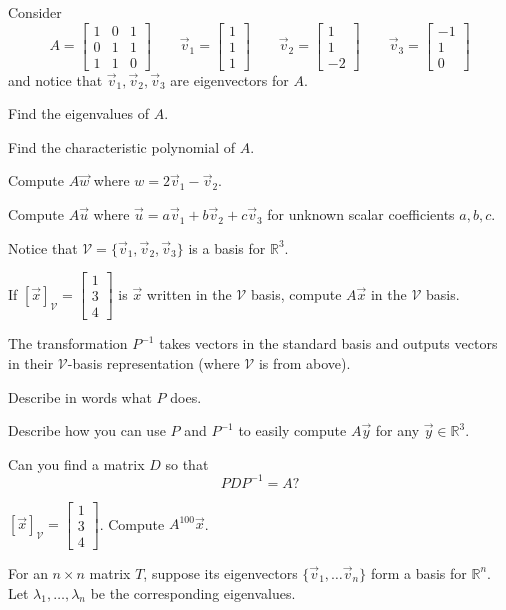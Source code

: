 \documentclass{problemset}
\newcommand{\R}{\mathbb{R}}
\newcommand{\mat}[1]{\begin{bmatrix}#1\end{bmatrix}}
\begin{document}
	\question
	Consider
	\[
		A=\mat{1&0&1\\0&1&1\\1&1&0}\qquad
		\vec v_1=\mat{1\\1\\1}\qquad
		\vec v_2=\mat{1\\1\\-2}\qquad
		\vec v_3=\mat{-1\\1\\0}
	\]
	and notice that $\vec v_1,\vec v_2,\vec v_3$ are eigenvectors for $A$.
	\begin{parts}
		\item Find the eigenvalues of $A$.
		\item Find the characteristic polynomial of $A$.
		\item Compute $A\vec w$ where $w=2\vec v_1-\vec v_2$.
		\item Compute $A\vec u$ where $\vec u=a\vec v_1+b\vec v_2+c\vec v_3$ for
			unknown scalar coefficients $a,b,c$.
	\end{parts}
	Notice that $\mathcal V=\{\vec v_1,\vec v_2,\vec v_3\}$ is a basis for $\R^3$.
	\begin{parts}[resume]
	\item If $[\vec x]_{\mathcal V}=\mat{1\\3\\4}$ is $\vec x$ written in the $\mathcal V$ basis,
		compute $A\vec x$ in the $\mathcal V$ basis.
	\end{parts}
	
	\question
	The transformation $P^{-1}$ takes vectors in the standard basis and outputs
	vectors in their $\mathcal V$-basis representation (where $\mathcal V$ is from above).  
	\begin{parts}
		\item Describe in words what $P$ does.
		\item Describe how you can use $P$ and $P^{-1}$ to easily compute
			$A\vec y$ for any $\vec y\in \R^3$.
		\item Can you find a matrix $D$ so that
			\[
				PDP^{-1}=A?
			\]
		\item $[\vec x]_{\mathcal V}=\mat{1\\3\\4}$.  Compute $A^{100}\vec x$.
	\end{parts}


	\question
	For an $n\times n$ matrix $T$, suppose its eigenvectors $\{\vec v_1,\ldots \vec v_n\}$
	form a basis for $\R^n$.  Let $\lambda_1,\ldots,\lambda_n$ be the corresponding
	eigenvalues.
	
\end{document}
